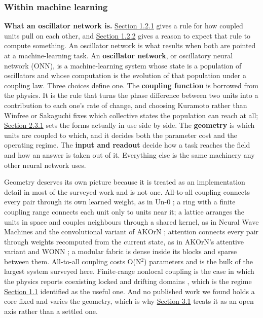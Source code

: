 \documentclass[a4paper,fleqn]{cas-sc}
\begin{document}
\subsubsection{Within machine learning}\label{sec-1-2-3}

\textbf{What an oscillator network is.} \hyperref[sec-1-2-1]{Section
1.2.1} gives a rule for how coupled units pull on each other, and
\hyperref[sec-1-2-2]{Section 1.2.2} gives a reason to expect that rule
to compute something. An oscillator network is what results when both
are pointed at a machine-learning task. An \textbf{oscillator network},
or oscillatory neural network (ONN), is a machine-learning system whose
state is a population of oscillators and whose computation is the
evolution of that population under a coupling law. Three choices define
one. The \textbf{coupling function} is borrowed from the physics. It is
the rule that turns the phase difference between two units into a
contribution to each one's rate of change, and choosing Kuramoto rather
than Winfree or Sakaguchi fixes which collective states the population
can reach at all; \hyperref[sec-2-3-1]{Section 2.3.1} sets the forms
actually in use side by side. The \textbf{geometry} is which units are
coupled to which, and it decides both the parameter cost and the
operating regime. The \textbf{input and readout} decide how a task
reaches the field and how an answer is taken out of it. Everything else
is the same machinery any other neural network uses.

Geometry deserves its own picture because it is treated as an
implementation detail in most of the surveyed work and is not one.
All-to-all coupling connects every pair through its own learned weight,
as in Un-0 \citep{un-0}; a ring with a finite coupling range connects
each unit only to units near it; a lattice arranges the units in space
and couples neighbours through a shared kernel, as in Neural Wave
Machines \citep{keller2023} and the convolutional variant of AKOrN
\citep{akorn}; attention connects every pair through weights recomputed
from the current state, as in AKOrN's attentive variant and WONN
\citep{wonn}; a modular fabric is dense inside its blocks and sparse
between them. All-to-all coupling costs O(N\ensuremath{^{2}}) parameters
and is the bulk of the largest system surveyed here. Finite-range
nonlocal coupling is the case in which the physics reports coexisting
locked and drifting domains \citep{kuramoto2002}, which is the regime
\hyperref[sec-1-1]{Section 1.1} identified as the useful one. And no
published work we found holds a core fixed and varies the geometry,
which is why \hyperref[sec-3-1]{Section 3.1} treats it as an open axis
rather than a settled one.
\end{document}
